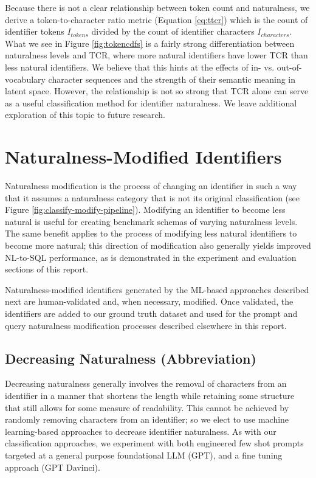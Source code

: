 Because there is not a clear relationship between token count and naturalness, we derive a token-to-character ratio metric (Equation \ref{eq:ttcr}) which is the count of identifier tokens $I_{tokens}$ divided by the count of identifier characters $I_{characters}$.
What we see in Figure \ref{fig:tokencdfs} is a fairly strong differentiation between naturalness levels and TCR, where more natural identifiers have lower TCR than less natural identifiers.
We believe that this hints at the effects of in- vs. out-of-vocabulary character sequences and the strength of their semantic meaning in latent space.
However, the relationship is not so strong that TCR alone can serve as a useful classification method for identifier naturalness.
We leave additional exploration of this topic to future research.



\section{Naturalness-Modified Identifiers}


Naturalness modification is the process of changing an identifier in such a way that it assumes a naturalness category that is not its original classification (see Figure \ref{fig:classify-modify-pipeline}).
Modifying an identifier to become less natural is useful for creating benchmark schemas of varying naturalness levels.
The same benefit applies to the process of modifying less natural identifiers to become more natural; this direction of modification also generally yields improved NL-to-SQL performance, as is demonstrated in the experiment and evaluation sections of this report.

Naturalness-modified identifiers generated by the ML-based approaches described next are human-validated and, when necessary, modified.
Once validated, the identifiers are added to our ground truth dataset and used for the prompt and query naturalness modification processes described elsewhere in this report.

\subsection{Decreasing Naturalness (Abbreviation)}
Decreasing naturalness generally involves the removal of characters from an identifier in a manner that shortens the length while retaining some structure that still allows for some measure of readability.
This cannot be achieved by randomly removing characters from an identifier; so we elect to use machine learning-based approaches to decrease identifier naturalness.
As with our classification approaches, we experiment with both engineered few shot prompts targeted at a general purpose foundational LLM (GPT), and a fine tuning approach (GPT Davinci).

